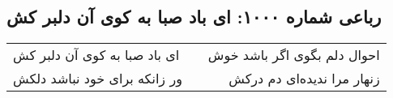 \begin{center}
\section*{رباعی شماره ۱۰۰۰: ای باد صبا به کوی آن دلبر کش}
\label{sec:1000}
\begin{longtable}{l p{0.5cm} r}
ای باد صبا به کوی آن دلبر کش
&&
احوال دلم بگوی اگر باشد خوش
\\
ور زانکه برای خود نباشد دلکش
&&
زنهار مرا ندیده‌ای دم درکش
\\
\end{longtable}
\end{center}
